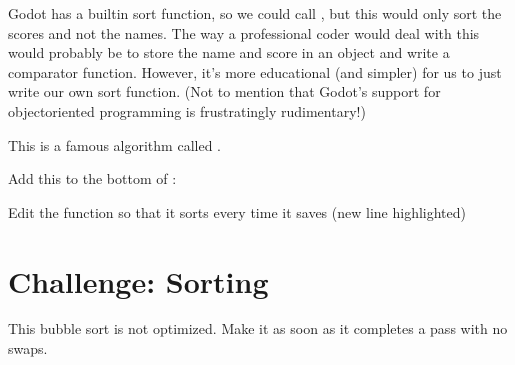 \documentclass[letterpaper,10pt,english]{sphinxmanual}
\begin{document}
\sphinxAtStartPar
Godot has a built\sphinxhyphen{}in sort function, so we could call , but this would only sort the
scores and not the names. The way a professional coder would deal with this would probably be to
store the name and score in an object and write a comparator function. However, it’s more
educational (and simpler) for us to just write our own sort function.  (Not to mention that Godot’s
support for object\sphinxhyphen{}oriented programming is frustratingly rudimentary!)

\sphinxAtStartPar
This is a famous algorithm called .

\sphinxAtStartPar
Add this to the bottom of :

\begin{sphinxVerbatim}[commandchars=\\\{\}]
 
	   
		   
			 \PYG{p}{[}\PYG{p}{]}\PYG{p}{[}\PYG{p}{]}
				   \PYG{p}{[}\PYG{p}{]}
				\PYG{p}{[}\PYG{p}{]}  \PYG{p}{[}\PYG{p}{]}
				\PYG{p}{[}\PYG{p}{]}  
				  \PYG{p}{[}\PYG{p}{]}
				\PYG{p}{[}\PYG{p}{]}  \PYG{p}{[}\PYG{p}{]}
				\PYG{p}{[}\PYG{p}{]}  
\end{sphinxVerbatim}

\sphinxAtStartPar
Edit the  function so that it sorts every time it saves (new line highlighted)


\section{Challenge: Sorting}
\label{\detokenize{pandoc_tut:challenge-sorting}}
\sphinxAtStartPar
This bubble sort is not optimized.  Make it  as soon as it completes a pass with no swaps.
\end{document}
